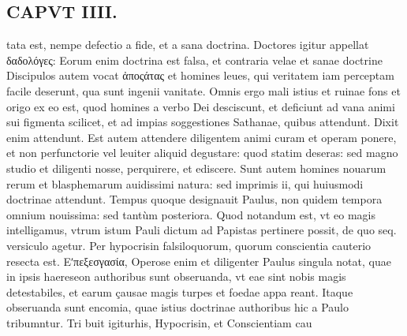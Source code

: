 \documentclass{article}
\begin{document}
\begin{pages}
\section*{CAPVT  IIII. }
\marginpar{[ p.185 ]}\pstart tata est, nempe defectio a fide, et a sana doctrina. Doctores igitur appellat δαδολόγες: Eorum enim doctrina est falsa, et contraria velae et sanae doctrine Discipulos autem vocat ἀποςάτας et homines leues, qui veritatem iam perceptam facile deserunt, qua sunt ingenii vanitate. Omnis ergo mali istius et ruinae fons et origo ex eo est, quod homines a verbo Dei desciscunt, et deficiunt ad vana animi sui figmenta scilicet, et ad impias soggestiones Sathanae, quibus attendunt. Dixit enim attendunt. Est autem attendere diligentem animi curam et operam ponere, et non perfunctorie vel leuiter aliquid degustare: quod statim deseras: sed magno studio et diligenti nosse, perquirere, et ediscere. Sunt autem homines nouarum rerum et blasphemarum auidissimi natura: sed imprimis ii, qui huiusmodi doctrinae attendunt. Tempus quoque designauit Paulus, non quidem tempora omnium nouissima: sed tantùm posteriora. Quod notandum est, vt eo magis intelligamus, vtrum istum Pauli dictum ad Papistas pertinere possit, de quo seq. versiculo agetur.  \pend{} Per hypocrisin falsiloquorum, quorum conscientia cauterio resecta est.  \pend\pstart Εʹπεξεσγασία, Operose enim et diligenter Paulus singula notat, quae in ipsis haereseon authoribus sunt obseruanda, vt eae sint nobis magis detestabiles, et earum çausae magis turpes et foedae appa reant. Itaque obseruanda sunt encomia, quae istius doctrinae authoribus hic a Paulo tribumntur. Tri buit igiturhis, Hypocrisin, et Conscientiam cau  \pend

\end{pages}
\end{document}
